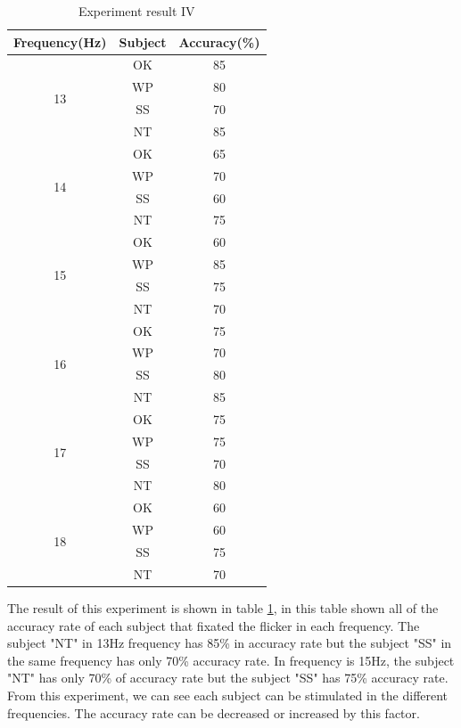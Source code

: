 \begin{table}[ht]
\centering
\begin{tabular}{| c | c | c |}   

    \hline
	\textbf{Frequency(Hz)}&
	\textbf{Subject}&
	\textbf{Accuracy(\%)}\\
            \hline
            \multirow{4}{*}{13}&OK&85\\
			\cline{2-3}
			&WP&80 \\ \cline{2-3}
			&SS&70 \\ \cline{2-3}
			&NT&85 \\
            \hline
            \multirow{4}{*}{14}&OK&65\\
			\cline{2-3}
			&WP&70 \\ \cline{2-3}
			&SS&60 \\ \cline{2-3}
			&NT&75 \\
            \hline
            \multirow{4}{*}{15}&OK&60\\
			\cline{2-3}
			&WP&85 \\ \cline{2-3}
			&SS&75 \\ \cline{2-3}
			&NT&70 \\
            \hline
            \multirow{4}{*}{16}&OK&75\\
			\cline{2-3}
			&WP&70 \\ \cline{2-3}
			&SS&80 \\ \cline{2-3}
			&NT&85 \\
            \hline
            \multirow{4}{*}{17}&OK&75\\
			\cline{2-3}
			&WP&75 \\ \cline{2-3}
			&SS&70 \\ \cline{2-3}
			&NT&80 \\
            \hline
            \multirow{4}{*}{18}&OK&60\\
			\cline{2-3}
			&WP&60 \\ \cline{2-3}
			&SS&75 \\ \cline{2-3}
			&NT&70 \\
            \hline
		\end{tabular}       
\caption{Experiment result IV}
\label{table:result4}
\end{table}
The result of this experiment is shown in table \ref{table:result4},  in this table shown all of the accuracy rate of each subject that fixated the flicker in each frequency. The subject "NT" in 13Hz frequency has 85\% in accuracy rate but the subject "SS" in the same frequency has only 70\% accuracy rate. In frequency is 15Hz, the subject "NT" has only 70\% of accuracy rate but the subject "SS" has 75\% accuracy rate. From this experiment, we can see each subject can be stimulated in the different frequencies. The accuracy rate can be decreased or increased by this factor.



